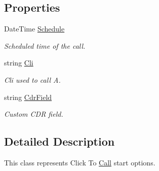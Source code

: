 \subsection*{Properties}
\begin{DoxyCompactItemize}
\item 
Date\+Time \hyperlink{class_thecallr_api_1_1_objects_1_1_click_to_call_1_1_start_options_a337a4946d6d64829e547063aceb5b7e4}{Schedule}
\begin{DoxyCompactList}\small\item\em Scheduled time of the call. \end{DoxyCompactList}\item 
string \hyperlink{class_thecallr_api_1_1_objects_1_1_click_to_call_1_1_start_options_a8abb85d77f1a2d566a84518cb1e1a2d3}{Cli}
\begin{DoxyCompactList}\small\item\em Cli used to call A. \end{DoxyCompactList}\item 
string \hyperlink{class_thecallr_api_1_1_objects_1_1_click_to_call_1_1_start_options_a37c5fe3ec639c49e9bd39143f6d026d6}{Cdr\+Field}
\begin{DoxyCompactList}\small\item\em Custom C\+D\+R field. \end{DoxyCompactList}\end{DoxyCompactItemize}


\subsection{Detailed Description}
This class represents Click To \hyperlink{class_thecallr_api_1_1_objects_1_1_click_to_call_1_1_call}{Call} start options. 



